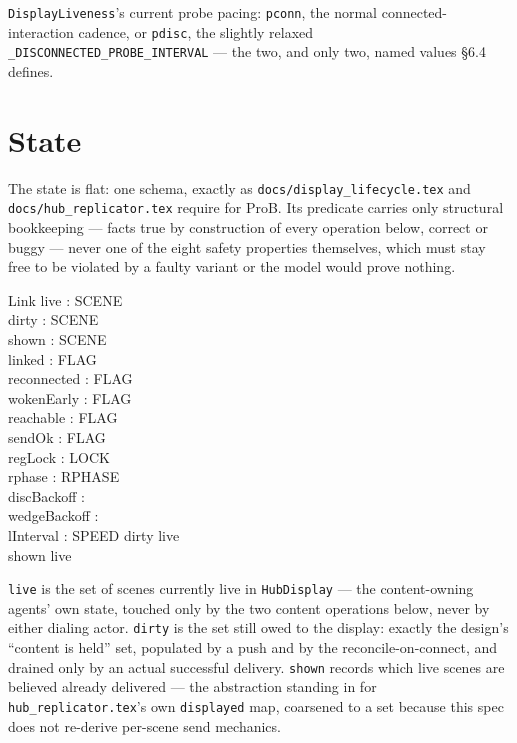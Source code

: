 \documentclass[a4paper,10pt,fleqn]{article}
\begin{document}
\texttt{DisplayLiveness}'s current probe pacing: \texttt{pconn}, the normal
connected-interaction cadence, or \texttt{pdisc}, the slightly relaxed
\texttt{\_DISCONNECTED\_PROBE\_INTERVAL} --- the two, and only two, named
values \S6.4 defines.

\section{State}
\label{sec:state}

The state is flat: one schema, exactly as
\texttt{docs/display\_lifecycle.tex} and \texttt{docs/hub\_replicator.tex}
require for ProB.  Its predicate carries only structural bookkeeping ---
facts true by construction of every operation below, correct or buggy ---
never one of the eight safety properties themselves, which must stay free
to be violated by a faulty variant or the model would prove nothing.

\begin{schema}{Link}
  live : \power SCENE \\
  dirty : \power SCENE \\
  shown : \power SCENE \\
  linked : FLAG \\
  reconnected : FLAG \\
  wokenEarly : FLAG \\
  reachable : FLAG \\
  sendOk : FLAG \\
  regLock : LOCK \\
  rphase : RPHASE \\
  discBackoff : \nat \\
  wedgeBackoff : \nat \\
  lInterval : SPEED
\where
  dirty \subseteq live \\
  shown \subseteq live
\end{schema}

\texttt{live} is the set of scenes currently live in \texttt{HubDisplay} ---
the content-owning agents' own state, touched only by the two content
operations below, never by either dialing actor.  \texttt{dirty} is the set
still owed to the display: exactly the design's ``content is held'' set,
populated by a push and by the reconcile-on-connect, and drained only by an
actual successful delivery.  \texttt{shown} records which live scenes are
believed already delivered --- the abstraction standing in for
\texttt{hub\_replicator.tex}'s own \texttt{displayed} map, coarsened to a
set because this spec does not re-derive per-scene send mechanics.
\end{document}
